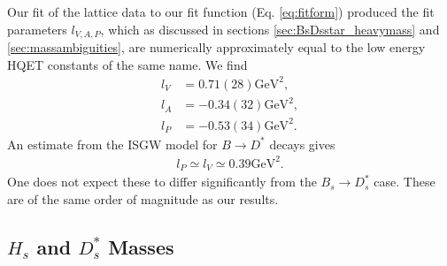 
Our fit of the lattice data to our fit function (Eq. \eqref{eq:fitform}) produced the fit parameters $l_{V,A,P}$, which as discussed in sections \ref{sec:BsDsstar_heavymass} and \ref{sec:massambiguities}, are numerically approximately equal to the low energy HQET constants of the same name. We find
\begin{align}
  \nonumber  l_V &= 0.71(28)\text{GeV}^2, \\  l_A &= -0.34(32)\text{GeV}^2, \label{eq:hqet_constants}
  \\ \nonumber l_P &= -0.53(34)\text{GeV}^2.
\end{align}
An estimate from the ISGW model for $B\to D^*$ decays gives \cite{PhysRevD.39.799}
\begin{align}
  l_P \simeq l_V \simeq 0.39\text{GeV}^2.
\end{align}
One does not expect these to differ significantly from the $B_s\to D_s^*$ case. These are of the same order of magnitude as our results.

\subsection{$H_s$ and $D_s^*$ Masses}

